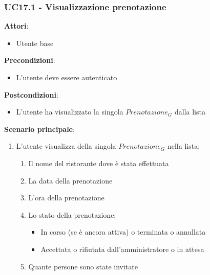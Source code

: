\subsubsection{UC17.1 - Visualizzazione prenotazione}\label{usecase:17_1}
\textbf{Attori}:
\begin{itemize}
    \item Utente base
\end{itemize}
\textbf{Precondizioni}:
\begin{itemize}
    \item L'utente deve essere autenticato
\end{itemize}
\textbf{Postcondizioni}:
\begin{itemize}
    \item L'utente ha visualizzato la singola $\textit{Prenotazione}_G$ dalla lista
\end{itemize}
\textbf{Scenario principale}:
\begin{enumerate}
    \item L'utente visualizza della singola $\textit{Prenotazione}_G$ nella lista:
    \begin{enumerate}
        \item Il nome del ristorante dove è stata effettuata
        \item La data della prenotazione
        \item L'ora della prenotazione
        \item Lo stato della prenotazione:
            \begin{itemize}
                \item In corso (se è ancora attiva) o terminata  o annullata
                \item Accettata o rifiutata dall'amministratore o in attesa
        \end{itemize}
        \item Quante persone sono state invitate
    \end{enumerate}
\end{enumerate}
\newpage